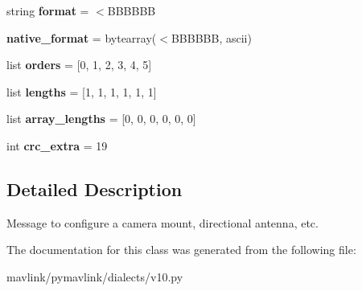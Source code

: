 \begin{DoxyCompactItemize}
string {\bfseries format} = \textquotesingle{}$<$B\+B\+B\+B\+BB\textquotesingle{}
\item 
\mbox{\label{classpymavlink_1_1dialects_1_1v10_1_1MAVLink__mount__configure__message_a164d42ad0a3468a314f34c5644f58324}} 
{\bfseries native\+\_\+format} = bytearray(\textquotesingle{}$<$B\+B\+B\+B\+BB\textquotesingle{}, \textquotesingle{}ascii\textquotesingle{})
\item 
\mbox{\label{classpymavlink_1_1dialects_1_1v10_1_1MAVLink__mount__configure__message_abe1dc4c57c568add3eb79739fcf900ce}} 
list {\bfseries orders} = \mbox{[}0, 1, 2, 3, 4, 5\mbox{]}
\item 
\mbox{\label{classpymavlink_1_1dialects_1_1v10_1_1MAVLink__mount__configure__message_a99c6629cd004f4dbccf0a950b8a6e947}} 
list {\bfseries lengths} = \mbox{[}1, 1, 1, 1, 1, 1\mbox{]}
\item 
\mbox{\label{classpymavlink_1_1dialects_1_1v10_1_1MAVLink__mount__configure__message_a6c918d1bdd49431286c11788060f738c}} 
list {\bfseries array\+\_\+lengths} = \mbox{[}0, 0, 0, 0, 0, 0\mbox{]}
\item 
\mbox{\label{classpymavlink_1_1dialects_1_1v10_1_1MAVLink__mount__configure__message_af099dbe71cf079628033a030db2bc8e4}} 
int {\bfseries crc\+\_\+extra} = 19
\end{DoxyCompactItemize}


\subsection{Detailed Description}
\begin{DoxyVerb}Message to configure a camera mount, directional antenna, etc.
\end{DoxyVerb}
 

The documentation for this class was generated from the following file\+:\begin{DoxyCompactItemize}
\item 
mavlink/pymavlink/dialects/v10.\+py\end{DoxyCompactItemize}
